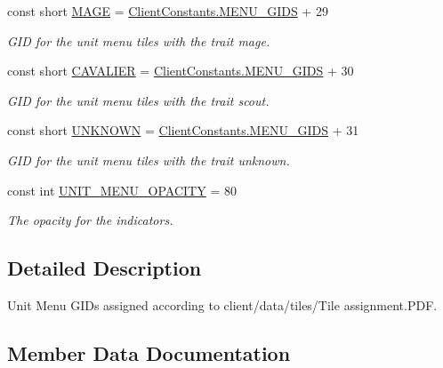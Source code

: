 \begin{DoxyCompactItemize}
const short \hyperlink{classClient_1_1Common_1_1Constants_1_1UnitMenuGid_ae4ab86aa390832ec8c42f4d6e160fc33}{M\+A\+G\+E} = \hyperlink{classClient_1_1Common_1_1Constants_1_1ClientConstants_a4d3b0e4f36481c991c9995cb20c9347d}{Client\+Constants.\+M\+E\+N\+U\+\_\+\+G\+I\+D\+S} + 29
\begin{DoxyCompactList}\small\item\em G\+I\+D for the unit menu tiles with the trait mage. \end{DoxyCompactList}\item 
const short \hyperlink{classClient_1_1Common_1_1Constants_1_1UnitMenuGid_a93d49144a5f9b5cb8ac8c9e9e44c70de}{C\+A\+V\+A\+L\+I\+E\+R} = \hyperlink{classClient_1_1Common_1_1Constants_1_1ClientConstants_a4d3b0e4f36481c991c9995cb20c9347d}{Client\+Constants.\+M\+E\+N\+U\+\_\+\+G\+I\+D\+S} + 30
\begin{DoxyCompactList}\small\item\em G\+I\+D for the unit menu tiles with the trait scout. \end{DoxyCompactList}\item 
const short \hyperlink{classClient_1_1Common_1_1Constants_1_1UnitMenuGid_a71308b3b40b8288fa5497321ecc4df92}{U\+N\+K\+N\+O\+W\+N} = \hyperlink{classClient_1_1Common_1_1Constants_1_1ClientConstants_a4d3b0e4f36481c991c9995cb20c9347d}{Client\+Constants.\+M\+E\+N\+U\+\_\+\+G\+I\+D\+S} + 31
\begin{DoxyCompactList}\small\item\em G\+I\+D for the unit menu tiles with the trait unknown. \end{DoxyCompactList}\item 
const int \hyperlink{classClient_1_1Common_1_1Constants_1_1UnitMenuGid_ad09c591a300fe4eeccff431758628820}{U\+N\+I\+T\+\_\+\+M\+E\+N\+U\+\_\+\+O\+P\+A\+C\+I\+T\+Y} = 80
\begin{DoxyCompactList}\small\item\em The opacity for the indicators. \end{DoxyCompactList}\end{DoxyCompactItemize}


\subsection{Detailed Description}
Unit Menu G\+I\+Ds assigned according to \textquotesingle{}client/data/tiles/\+Tile assignment.\+P\+D\+F\textquotesingle{}. 



\subsection{Member Data Documentation}
\hypertarget{classClient_1_1Common_1_1Constants_1_1UnitMenuGid_a818316b1993049515539c636aac7ad44}{}
